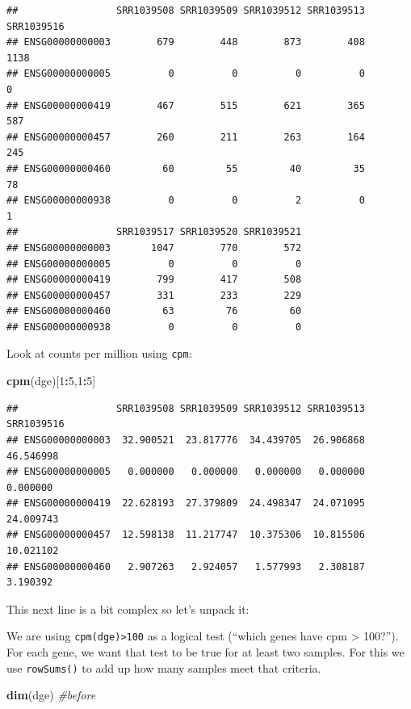 \documentclass[
]{book}
\newenvironment{Shaded}{\begin{snugshade}}{\end{snugshade}}
\newcommand{\CommentTok}[1]{\textcolor[rgb]{0.56,0.35,0.01}{\textit{#1}}}
\newcommand{\DecValTok}[1]{\textcolor[rgb]{0.00,0.00,0.81}{#1}}
\newcommand{\FunctionTok}[1]{\textcolor[rgb]{0.13,0.29,0.53}{\textbf{#1}}}
\newcommand{\NormalTok}[1]{#1}
\newcommand{\SpecialCharTok}[1]{\textcolor[rgb]{0.81,0.36,0.00}{\textbf{#1}}}
\begin{document}
\begin{verbatim}
##                 SRR1039508 SRR1039509 SRR1039512 SRR1039513 SRR1039516
## ENSG00000000003        679        448        873        408       1138
## ENSG00000000005          0          0          0          0          0
## ENSG00000000419        467        515        621        365        587
## ENSG00000000457        260        211        263        164        245
## ENSG00000000460         60         55         40         35         78
## ENSG00000000938          0          0          2          0          1
##                 SRR1039517 SRR1039520 SRR1039521
## ENSG00000000003       1047        770        572
## ENSG00000000005          0          0          0
## ENSG00000000419        799        417        508
## ENSG00000000457        331        233        229
## ENSG00000000460         63         76         60
## ENSG00000000938          0          0          0
\end{verbatim}

Look at counts per million using \texttt{cpm}:

\begin{Shaded}
\begin{Highlighting}[]
\FunctionTok{cpm}\NormalTok{(dge)[}\DecValTok{1}\SpecialCharTok{:}\DecValTok{5}\NormalTok{,}\DecValTok{1}\SpecialCharTok{:}\DecValTok{5}\NormalTok{]}
\end{Highlighting}
\end{Shaded}

\begin{verbatim}
##                 SRR1039508 SRR1039509 SRR1039512 SRR1039513 SRR1039516
## ENSG00000000003  32.900521  23.817776  34.439705  26.906868  46.546998
## ENSG00000000005   0.000000   0.000000   0.000000   0.000000   0.000000
## ENSG00000000419  22.628193  27.379809  24.498347  24.071095  24.009743
## ENSG00000000457  12.598138  11.217747  10.375306  10.815506  10.021102
## ENSG00000000460   2.907263   2.924057   1.577993   2.308187   3.190392
\end{verbatim}

This next line is a bit complex so let's unpack it:

We are using \texttt{cpm(dge)\textgreater{}100} as a logical test (``which genes have cpm \textgreater{} 100?'').
For each gene, we want that test to be true for at least two samples. For this we use \texttt{rowSums()} to add up how many samples meet that criteria.

\begin{Shaded}
\begin{Highlighting}[]
\FunctionTok{dim}\NormalTok{(dge) }\CommentTok{\#before }
\end{Highlighting}
\end{Shaded}
\end{document}
